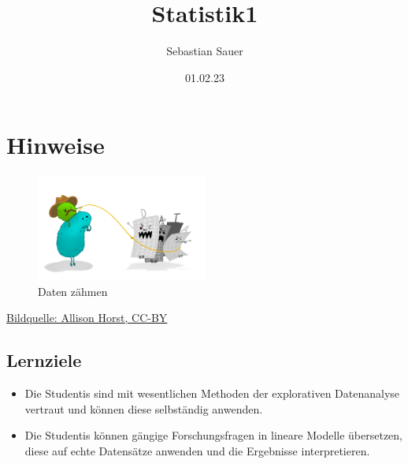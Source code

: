 \documentclass[
  a4paper,
  DIV=11]{scrreprt}
\title{Statistik1}
\author{Sebastian Sauer}
\date{01.02.23}
\renewcommand*\contentsname{Inhaltsverzeichnis}
\newcommand\contentsname{Inhaltsverzeichnis}
\theoremstyle{definition}
\theoremstyle{definition}
\theoremstyle{remark}
\begin{document}
\maketitle
\ifdefined\Shaded\renewenvironment{Shaded}{\begin{tcolorbox}[interior hidden, frame hidden, borderline west={3pt}{0pt}{shadecolor}, enhanced, sharp corners, breakable, boxrule=0pt]}{\end{tcolorbox}}\fi

\renewcommand*\contentsname{Inhaltsverzeichnis}
{
\hypersetup{linkcolor=}
\setcounter{tocdepth}{2}
\tableofcontents
}

\hypertarget{hinweise}{%
\chapter*{Hinweise}\label{hinweise}}


\begin{figure}

{\centering \includegraphics[width=0.5\textwidth,height=\textheight]{./img/datenzaehmen.png}

}

\caption{Daten zähmen}

\end{figure}

\href{https://github.com/allisonhorst/stats-illustrations}{Bildquelle:
Allison Horst, CC-BY}

\hypertarget{lernziele}{%
\section*{Lernziele}\label{lernziele}}


\begin{itemize}
\item
  Die Studentis sind mit wesentlichen Methoden der explorativen
  Datenanalyse vertraut und können diese selbständig anwenden.
\item
  Die Studentis können gängige Forschungsfragen in lineare Modelle
  übersetzen, diese auf echte Datensätze anwenden und die Ergebnisse
  interpretieren.
\end{itemize}
\end{document}
